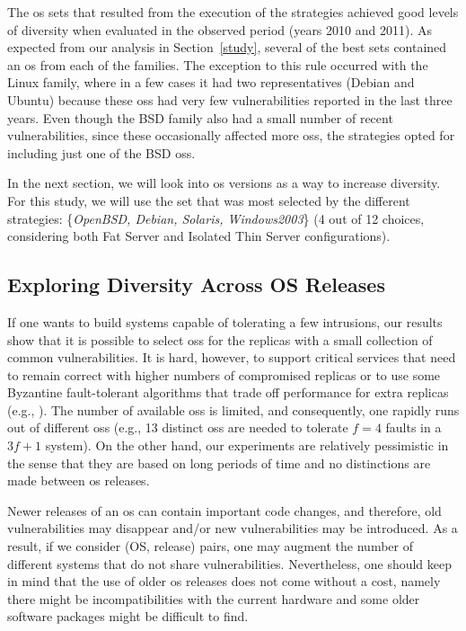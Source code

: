 The \gls{os} sets that resulted from the execution of the strategies achieved good levels of diversity when evaluated in the observed period (years 2010 and 2011). 
As expected from our analysis in Section~\ref{study}, several of the best sets contained an \gls{os} from each of the families. 
The exception to this rule occurred with the Linux family, where in a few cases it had two representatives (Debian and Ubuntu) because these \glspl{os} had very few vulnerabilities reported in the last three years. 
Even though the BSD family also had a small number of recent vulnerabilities, since these occasionally affected more \glspl{os}, the strategies opted for including just one of the BSD \glspl{os}.

In the next section, we will look into \gls{os} versions as a way to increase diversity. 
For this study, we will use the set that was most selected by the different strategies: \{\emph{OpenBSD, Debian, Solaris, Windows2003}\} (4 out of 12 choices, considering both Fat Server and Isolated Thin Server configurations).


\subsection*{Exploring Diversity Across OS Releases}
\label{releases}

If one wants to build systems capable of tolerating a few intrusions, our results show that it is possible to select \glspl{os} for the replicas with a small collection of common vulnerabilities. 
It is hard, however, to support critical services that need to remain correct with higher numbers of compromised replicas or to use some Byzantine fault-tolerant algorithms that trade off performance for extra replicas (e.g., \cite{Abd-El-Malek:2005,Kotla:2010,Serafini:2010}). 
The number of available \glspl{os} is limited, and consequently, one rapidly runs out of different \glspl{os} (e.g., 13 distinct \glspl{os} are needed to tolerate $f=4$ faults in a $3f+1$ system). 
On the other hand, our experiments are relatively pessimistic in the sense that they are based on long periods of time and no distinctions are made between \gls{os} releases.

Newer releases of an \gls{os} can contain important code changes, and therefore, old vulnerabilities may disappear and/or new vulnerabilities may be introduced. 
As a result, if we consider (OS, release) pairs, one may augment the number of different systems that do not share vulnerabilities. 
Nevertheless, one should keep in mind that the use of older \gls{os} releases does not come without a cost, namely there might be incompatibilities with the current hardware and some older software packages might be difficult to find.

